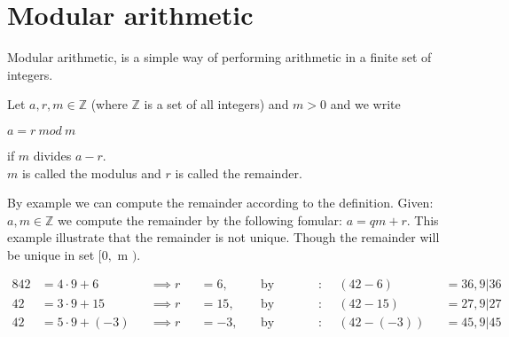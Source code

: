 \section{Modular arithmetic}
Modular arithmetic, is a simple way of performing arithmetic in a finite set of integers.

\begin{defi}
Let \begin{math} a, r,m \in  \mathbb{Z}\end{math} (where \begin{math} \mathbb{Z}\end{math} is a set of all integers) and \begin{math} m > 0\end{math} and we write  
\begin{center} \begin{math} a = r \ mod \ m\end{math} \end{center}
if \begin{math}m \end{math} divides \begin{math} a - r \end{math}.\\
\begin{math}m \end{math} is called the modulus and \begin{math}r \end{math} is called the remainder.
\end{defi}

 By example we can compute the remainder according to the definition. Given: \begin{math} a, m \in \mathbb{Z} \end{math} we compute the remainder by the following fomular:  \begin{math} a = qm +r \end{math}. This example illustrate that the remainder is not unique. Though the remainder will be unique in set $[0,$ m $)$.

\noindent
\begin{alignat*}{8}
42 &= 4 \cdot 9 +6 &&\implies r &&= 6 ,\ &&\text{by \ definition}: \  &&(42-6) &&= 36 ,  9| 36 \\
42 &= 3 \cdot 9 +15 &&\implies r &&= 15 ,\ &&\text{by \ definition}: \ &&(42-15) &&= 27 ,  9| 27 \\
42 &= 5 \cdot 9 +(-3) &&\implies r &&= -3 ,\ &&\text{by \ definition}: \ &&(42-(-3)) &&= 45 ,  9| 45 
\end{alignat*}





